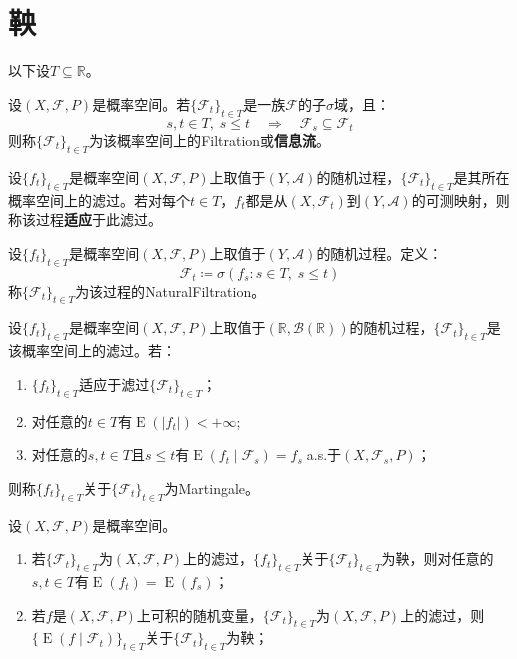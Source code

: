 \section{鞅}

以下设$T\subseteq\mathbb{R}$。
\begin{definition}
	设$(X,\mathscr{F},P)$是概率空间。若$\{\mathscr{F}_t\}_{t\in T}$是一族$\mathscr{F}$的子$\sigma$域，且：
	\begin{equation*}
		s,t\in T,\;s\leqslant t\quad\Longrightarrow\quad\mathscr{F}_s\subseteq\mathscr{F}_t
	\end{equation*}
	则称$\{\mathscr{F}_t\}_{t\in T}$为该概率空间上的\gls{Filtration}或\textbf{信息流}。
\end{definition}
\begin{definition}
	设$\{f_t\}_{t\in T}$是概率空间$(X,\mathscr{F},P)$上取值于$(Y,\mathscr{A})$的随机过程，$\{\mathscr{F}_t\}_{t\in T}$是其所在概率空间上的滤过。若对每个$t\in T$，$f_t$都是从$(X,\mathscr{F}_t)$到$(Y,\mathscr{A})$的可测映射，则称该过程\textbf{适应}于此滤过。
\end{definition}
\begin{definition}
	设$\{f_t\}_{t\in T}$是概率空间$(X,\mathscr{F},P)$上取值于$(Y,\mathscr{A})$的随机过程。定义：
	\begin{equation*}
		\mathscr{F}_t\coloneq\sigma(f_s:s\in T,\;s\leqslant t)
	\end{equation*}
	称$\{\mathscr{F}_t\}_{t\in T}$为该过程的\gls{NaturalFiltration}。
\end{definition}
\begin{definition}
	设$\{f_t\}_{t\in T}$是概率空间$(X,\mathscr{F},P)$上取值于$(\mathbb{R},\mathcal{B}(\mathbb{R}))$的随机过程，$\{\mathscr{F}_t\}_{t\in T}$是该概率空间上的滤过。若：
	\begin{enumerate}
		\item $\{f_t\}_{t\in T}$适应于滤过$\{\mathscr{F}_t\}_{t\in T}$；
		\item 对任意的$t\in T$有$\operatorname{E}(|f_t|)<+\infty$;
		\item 对任意的$s,t\in T$且$s\leqslant t$有$\operatorname{E}(f_t\mid\mathscr{F}_s)=f_s\;$a.s.于$(X,\mathscr{F}_s,P)$；
	\end{enumerate}
	则称$\{f_t\}_{t\in T}$关于$\{\mathscr{F}_t\}_{t\in T}$为\gls{Martingale}。
\end{definition}
\begin{property}\label{prop:Martingale}
	设$(X,\mathscr{F},P)$是概率空间。
	\begin{enumerate}
		\item 若$\{\mathscr{F}_t\}_{t\in T}$为$(X,\mathscr{F},P)$上的滤过，$\{f_t\}_{t\in T}$关于$\{\mathscr{F}_t\}_{t\in T}$为鞅，则对任意的$s,t\in T$有$\operatorname{E}(f_t)=\operatorname{E}(f_s)$；
		\item 若$f$是$(X,\mathscr{F},P)$上可积的随机变量，$\{\mathscr{F}_t\}_{t\in T}$为$(X,\mathscr{F},P)$上的滤过，则$\{\operatorname{E}(f\mid\mathscr{F}_t)\}_{t\in T}$关于$\{\mathscr{F}_t\}_{t\in T}$为鞅；
	\end{enumerate}
\end{property}
